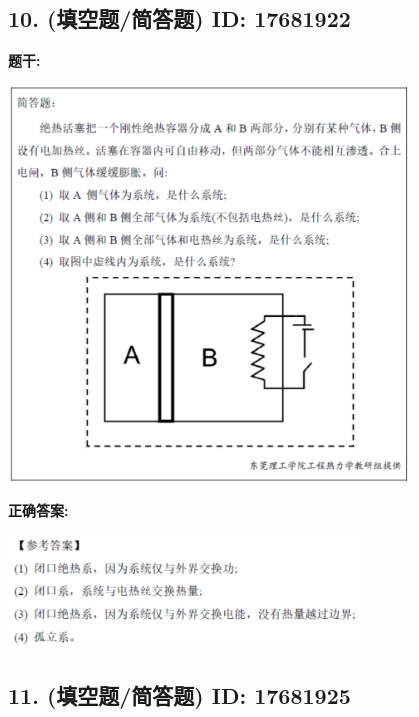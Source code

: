 \documentclass[12pt]{article}
\begin{document}
\subsection*{10. (填空题/简答题) \small ID: 17681922}

\textbf{题干:}


\begin{center}\includegraphics[width=0.8\textwidth, height=0.25\textheight, keepaspectratio]{question_10_17681922/title_img_1.png}\end{center}

\textbf{正确答案:}

\begin{center}\includegraphics[width=0.7\textwidth, height=0.2\textheight, keepaspectratio]{question_10_17681922/correct_answer_1_img_1.png}\end{center}

\vspace{0.5em}\hrulefill\vspace{1em}

\subsection*{11. (填空题/简答题) \small ID: 17681925}
\end{document}

